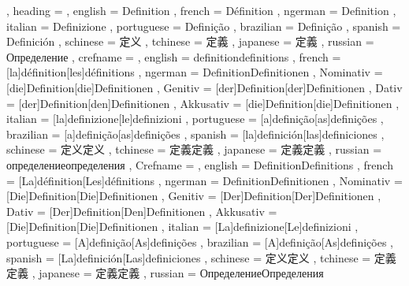   {
    , heading =   {
                    , english     = Definition
                    , french      = Définition
                    , ngerman     = Definition
                    , italian     = Definizione
                    , portuguese  = Definição
                    , brazilian   = Definição
                    , spanish     = Definición
                    , schinese    = 定义
                    , tchinese    = 定義
                    , japanese    = 定義
                    , russian     = Определение
                  }
    , crefname =  {
                    , english     = {definition}{definitions}
                    , french      = [la]{définition}[les]{définitions}
                    , ngerman     = { {Definition}{Definitionen}
                                      , Nominativ = [die]{Definition}[die]{Definitionen}
                                      , Genitiv   = [der]{Definition}[der]{Definitionen}
                                      , Dativ     = [der]{Definition}[den]{Definitionen}
                                      , Akkusativ = [die]{Definition}[die]{Definitionen}
                                    }
                    , italian     = [la]{definizione}[le]{definizioni}
                    , portuguese  = [a]{definição}[as]{definições}
                    , brazilian   = [a]{definição}[as]{definições}
                    , spanish     = [la]{definición}[las]{definiciones}
                    , schinese    = {定义}{定义}
                    , tchinese    = {定義}{定義}
                    , japanese    = {定義}{定義}
                    , russian     = {определение}{определения}
                  }
    , Crefname =  {
                    , english     = {Definition}{Definitions}
                    , french      = [La]{définition}[Les]{définitions}
                    , ngerman     = { {Definition}{Definitionen}
                                      , Nominativ = [Die]{Definition}[Die]{Definitionen}
                                      , Genitiv   = [Der]{Definition}[Der]{Definitionen}
                                      , Dativ     = [Der]{Definition}[Den]{Definitionen}
                                      , Akkusativ = [Die]{Definition}[Die]{Definitionen}
                                    }
                    , italian     = [La]{definizione}[Le]{definizioni}
                    , portuguese  = [A]{definição}[As]{definições}
                    , brazilian   = [A]{definição}[As]{definições}
                    , spanish     = [La]{definición}[Las]{definiciones}
                    , schinese    = {定义}{定义}
                    , tchinese    = {定義}{定義}
                    , japanese    = {定義}{定義}
                    , russian     = {Определение}{Определения}
                  }
  }

